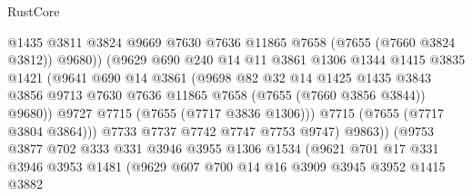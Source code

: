 \begin{lexlean}{RustCore}
\begin{coremodule}
                              @1435
                              @3811
                              @3824
                              @9669
                              @7630
                              @7636
                              @11865
                              @7658
                              (@7655 (@7660 @3824 @3812))
                              @9680))
                          (@9629
                            @690
                            @240
                            @14
                            @11
                            @3861
                            @1306
                            @1344
                            @1415
                            @3835
                            @1421
                            (@9641
                              @690
                              @14
                              @3861
                              (@9698
                                @82
                                @32
                                @14
                                @1425
                                @1435
                                @3843
                                @3856
                                @9713
                                @7630
                                @7636
                                @11865
                                @7658
                                (@7655 (@7660 @3856 @3844))
                                @9680))
                            @9727
                            @7715
                            (@7655 (@7717 @3836 @1306)))
                          @7715
                          (@7655 (@7717 @3804 @3864)))
                        @7733
                        @7737
                        @7742
                        @7747
                        @7753
                        @9747)
                      @9863))
                  (@9753
                    @3877
                    @702
                    @333
                    @331
                    @3946
                    @3955
                    @1306
                    @1534
                    (@9621
                      @701
                      @17
                      @331
                      @3946
                      @3953
                      @1481
                      (@9629
                        @607
                        @700
                        @14
                        @16
                        @3909
                        @3945
                        @3952
                        @1415
                        @3882

\end{coremodule}
\end{lexlean}
